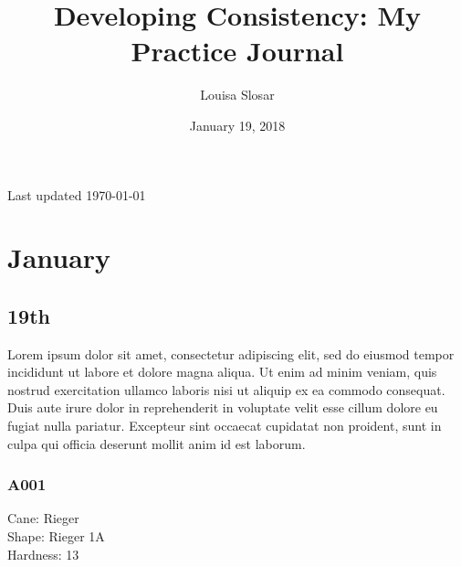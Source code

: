\documentclass[a4paper,12pt]{memoir}
\title{Developing Consistency: My Practice Journal}
\author{Louisa Slosar}
\date{January 19, 2018}
\begin{document}
\frontmatter %

\begin{titlingpage}

\begin{center}

\maketitle

\vspace{15cm}

Last updated \today

\end{center}

\end{titlingpage}

\tableofcontents*

\listoffigures*

\mainmatter


\chapter{January}

\section{19th}

Lorem ipsum dolor sit amet, consectetur adipiscing elit, sed do eiusmod tempor incididunt ut labore et dolore magna aliqua. Ut enim ad minim veniam, quis nostrud exercitation ullamco laboris nisi ut aliquip ex ea commodo consequat. Duis aute irure dolor in reprehenderit in voluptate velit esse cillum dolore eu fugiat nulla pariatur. Excepteur sint occaecat cupidatat non proident, sunt in culpa qui officia deserunt mollit anim id est laborum.

\subsection{A001}
Cane: Rieger \\
Shape: Rieger 1A \\
Hardness: 13 \\
\end{document}
